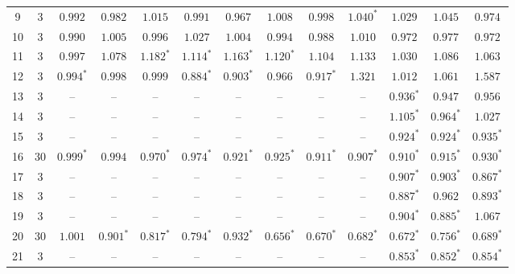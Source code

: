 \begin{table}[p]
\begin{tabular}{ccccccccccccc}
9 & 3 & $0.992$ & $0.982$ & $1.015$ & $0.991$ & $0.967$ & $1.008$ & $0.998$ & $1.040^{*}$ & $1.029$ & $1.045$ & $0.974$ \\
10 & 3 & $0.990$ & $1.005$ & $0.996$ & $1.027$ & $1.004$ & $0.994$ & $0.988$ & $1.010$ & $0.972$ & $0.977$ & $0.972$ \\
11 & 3 & $0.997$ & $1.078$ & $1.182^{*}$ & $1.114^{*}$ & $1.163^{*}$ & $1.120^{*}$ & $1.104$ & $1.133$ & $1.030$ & $1.086$ & $1.063$ \\
12 & 3 & $0.994^{*}$ & $0.998$ & $0.999$ & $0.884^{*}$ & $0.903^{*}$ & $0.966$ & $0.917^{*}$ & $1.321$ & $1.012$ & $1.061$ & $1.587$ \\
13 & 3 & -- & -- & -- & -- & -- & -- & -- & -- & $0.936^{*}$ & $0.947$ & $0.956$ \\
14 & 3 & -- & -- & -- & -- & -- & -- & -- & -- & $1.105^{*}$ & $0.964^{*}$ & $1.027$ \\
15 & 3 & -- & -- & -- & -- & -- & -- & -- & -- & $0.924^{*}$ & $0.924^{*}$ & $0.935^{*}$ \\
16 & 30 & $0.999^{*}$ & $0.994$ & $0.970^{*}$ & $0.974^{*}$ & $0.921^{*}$ & $0.925^{*}$ & $0.911^{*}$ & $0.907^{*}$ & $0.910^{*}$ & $0.915^{*}$ & $0.930^{*}$ \\
17 & 3 & -- & -- & -- & -- & -- & -- & -- & -- & $0.907^{*}$ & $0.903^{*}$ & $0.867^{*}$ \\
18 & 3 & -- & -- & -- & -- & -- & -- & -- & -- & $0.887^{*}$ & $0.962$ & $0.893^{*}$ \\
19 & 3 & -- & -- & -- & -- & -- & -- & -- & -- & $0.904^{*}$ & $0.885^{*}$ & $1.067$ \\
20 & 30 & $1.001$ & $0.901^{*}$ & $0.817^{*}$ & $0.794^{*}$ & $0.932^{*}$ & $0.656^{*}$ & $0.670^{*}$ & $0.682^{*}$ & $0.672^{*}$ & $0.756^{*}$ & $0.689^{*}$ \\
21 & 3 & -- & -- & -- & -- & -- & -- & -- & -- & $0.853^{*}$ & $0.852^{*}$ & $0.854^{*}$ \\
\bottomrule
\end{tabular}
\end{table}
